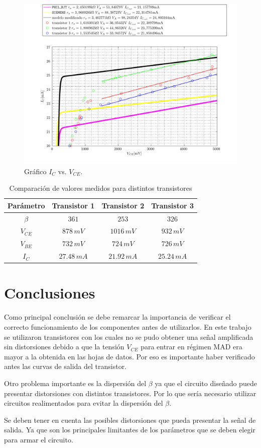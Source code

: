 \documentclass[10pt,spanish,a4paper,openany,notitlepage]{article}
\begin{document}
\begin{figure}[H]
\centering
\includegraphics[scale=0.8]{./imagenes/IcvsVce_25mA.pdf}
\caption{Gráfico $I_C$ vs. $V_{CE}$.}
\label{fig:ic_vce}
\end{figure}

\begin{table}[H]
\centering
\begin{tabular}{|c|c|c|c|}
\hline
Parámetro & Transistor 1 & Transistor 2 & Transistor 3 \\
\hline
$\beta$ & $361$ & $253$ & $326$ \\
\hline
$V_{CE}$ & $878\, \unit{mV}$ & $1016\, \unit{mV}$ & $932\, \unit{mV}$ \\
\hline
$V_{BE}$ & $732\, \unit{mV}$ & $724\, \unit{mV}$ & $726\, \unit{mV}$ \\
\hline
$I_C$ & $27.48\, \unit{mA}$ & $21.92\, \unit{mA}$ & $25.24\, \unit{mA}$ \\
\hline
\end{tabular}
\caption{Comparación de valores medidos para distintos transistores}
\label{table:comparacion_medicion}
\end{table}

\section{Conclusiones}

Como principal conclusión se debe remarcar la importancia de verificar
el correcto funcionamiento de los componentes antes de utilizarlos. En
este trabajo se utilizaron transistores con los cuales no se pudo obtener
una señal amplificada sin distorsiones debido a que la tensión $V_{CE}$
para entrar en régimen MAD era mayor a la obtenida en las hojas de datos.
Por eso es importante haber verificado antes las curvas de salida del
transistor.

Otro problema importante es la dispersión del $\beta$ ya que el circuito
diseñado puede presentar distorsiones con distintos transistores. Por
lo que sería necesario utilizar circuitos realimentados para evitar la
dispersión del $\beta$.

Se deben tener en cuenta las posibles distorsiones que pueda presentar
la señal de salida. Ya que son los principales limitantes de los parámetros
que se deben elegir para armar el circuito.
\end{document}
